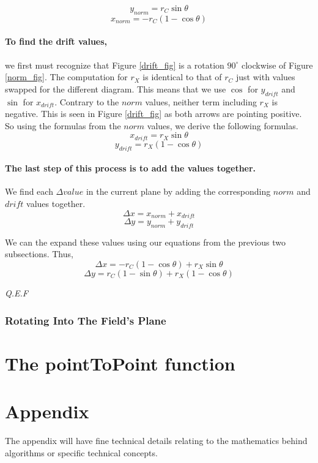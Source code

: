 \documentclass[12pt]{article}
\begin{document}
\centering
$$y_{norm} = r_C \sin\theta$$
$$x_{norm} = -r_C(1-\cos\theta)$$

\raggedright
\pagebreak

\paragraph{To find the drift values,} we first must recognize that Figure \ref{drift_fig} is a rotation $90^{\circ}$ clockwise of Figure \ref{norm_fig}. The computation for $r_X$ is identical to that of $r_C$ just with values swapped for the different diagram. This means that we use $\cos$ for $y_{drift}$ and $\sin$ for $x_{drift}$. Contrary to the $norm$ values, neither term including $r_X$ is negative. This is seen in Figure \ref{drift_fig} as both arrows are pointing positive. So using the formulas from the $norm$ values, we derive the following formulas.
$$ x_{drift} = r_X \sin\theta$$
$$ y_{drift} = r_X (1-\cos\theta)$$

\paragraph{The last step of this process is to add the values together.} We find each $\Delta value$ in the current plane by adding the corresponding $norm$ and $drift$ values together.
$$ \Delta x = x_{norm} + x_{drift} $$
$$ \Delta y = y_{norm} + y_{drift} $$

We can the expand these values using our equations from the previous two subsections. Thus,
$$ \Delta x =  -r_C (1-\cos\theta) + r_X \sin\theta $$
$$ \Delta y =  r_C (1-\sin\theta) + r_X (1-\cos\theta) $$

\textit{Q.E.F}
\subsubsection{Rotating Into The Field's Plane}



\section{The pointToPoint function}
%
%
\newpage
\appendix
\section*{Appendix}
The appendix will have fine technical details relating to the mathematics behind algorithms or specific technical concepts.
\end{document}
